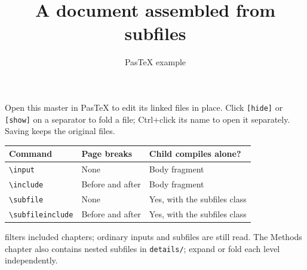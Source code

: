 \documentclass{article}
\title{A document assembled from subfiles}
\author{PasTeX example}
\date{}
\begin{document}
\maketitle
Open this master in PasTeX to edit its linked files in place. Click
\texttt{[hide]} or \texttt{[show]} on a separator to fold a file;
Ctrl+click its name to open it separately. Saving keeps the original files.

\begin{center}
\begin{tabular}{lll}
\toprule
Command & Page breaks & Child compiles alone? \\
\midrule
\texttt{\textbackslash input} & None & Body fragment \\
\texttt{\textbackslash include} & Before and after & Body fragment \\
\texttt{\textbackslash subfile} & None & Yes, with the subfiles class \\
\texttt{\textbackslash subfileinclude} & Before and after & Yes, with the subfiles class \\
\bottomrule
\end{tabular}
\end{center}
\verb|| filters included chapters; ordinary inputs and subfiles
are still read. The Methods chapter also contains nested subfiles in
\texttt{details/}; expand or fold each level independently.



\appendix

\end{document}
